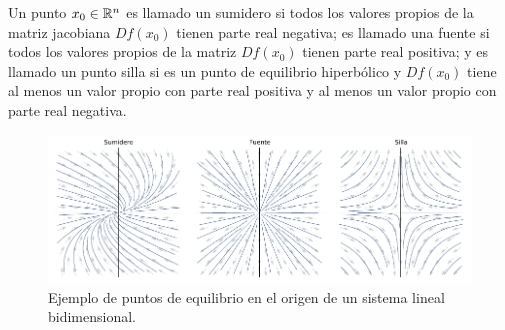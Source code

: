 \begin{defi}
	Un punto $x_{0} \in {\mathbb{R}}^{n}$ es llamado un sumidero si todos los valores propios de la matriz jacobiana $Df(x_{0})$ tienen parte real negativa; es llamado una fuente si todos los valores propios de la matriz $Df(x_{0})$ tienen parte real positiva; y es llamado un punto silla si es un punto de equilibrio hiperbólico y $Df(x_{0})$ tiene al menos un valor propio con parte real positiva y al menos un valor propio con parte real negativa.
\end{defi}

\begin{figure}
	\centering
	\includegraphics[width=1\textwidth]{img/EquilibriumPoints.pdf}
	\caption{Ejemplo de puntos de equilibrio en el origen de un sistema lineal bidimensional.}
	\label{fig: EquilibriumPoints}
\end{figure}